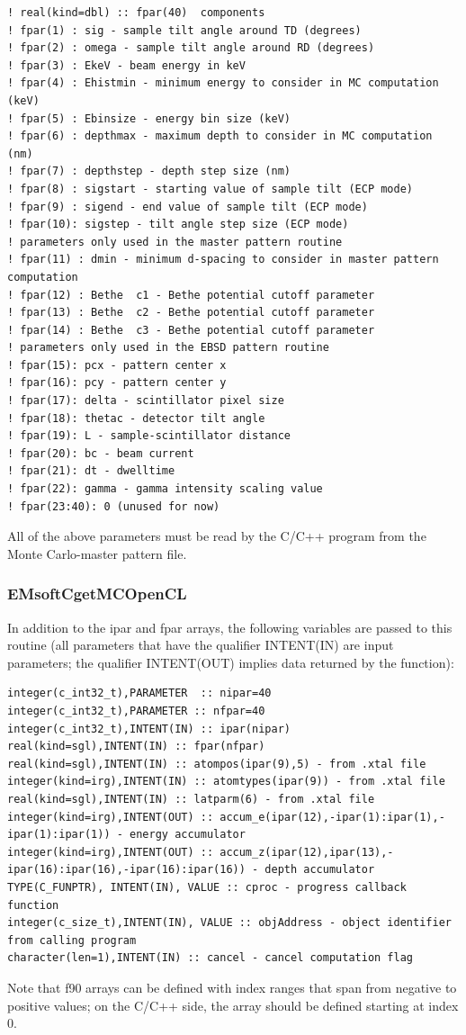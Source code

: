 \documentclass[DIV=calc, paper=letter, fontsize=11pt]{scrartcl}	 %
\begin{document}
{\begin{verbatim}
! real(kind=dbl) :: fpar(40)  components
! fpar(1) : sig - sample tilt angle around TD (degrees)
! fpar(2) : omega - sample tilt angle around RD (degrees)
! fpar(3) : EkeV - beam energy in keV
! fpar(4) : Ehistmin - minimum energy to consider in MC computation (keV)
! fpar(5) : Ebinsize - energy bin size (keV)
! fpar(6) : depthmax - maximum depth to consider in MC computation (nm)
! fpar(7) : depthstep - depth step size (nm)
! fpar(8) : sigstart - starting value of sample tilt (ECP mode)
! fpar(9) : sigend - end value of sample tilt (ECP mode)
! fpar(10): sigstep - tilt angle step size (ECP mode)
! parameters only used in the master pattern routine
! fpar(11) : dmin - minimum d-spacing to consider in master pattern computation
! fpar(12) : Bethe  c1 - Bethe potential cutoff parameter
! fpar(13) : Bethe  c2 - Bethe potential cutoff parameter
! fpar(14) : Bethe  c3 - Bethe potential cutoff parameter
! parameters only used in the EBSD pattern routine
! fpar(15): pcx - pattern center x
! fpar(16): pcy - pattern center y
! fpar(17): delta - scintillator pixel size
! fpar(18): thetac - detector tilt angle
! fpar(19): L - sample-scintillator distance
! fpar(20): bc - beam current
! fpar(21): dt - dwelltime
! fpar(22): gamma - gamma intensity scaling value
! fpar(23:40): 0 (unused for now)
\end{verbatim}}
All of the above parameters must be read by the C/C++ program from the Monte Carlo-master pattern file.

\subsubsection{EMsoftCgetMCOpenCL}
In addition to the \textsf{ipar} and \textsf{fpar} arrays, the following variables are 
passed to this routine (all parameters that have the qualifier \textsf{INTENT(IN)} are input parameters;
the qualifier \textsf{INTENT(OUT)} implies data returned by the function):

{\footnotesize\begin{verbatim}
integer(c_int32_t),PARAMETER  :: nipar=40
integer(c_int32_t),PARAMETER :: nfpar=40
integer(c_int32_t),INTENT(IN) :: ipar(nipar)
real(kind=sgl),INTENT(IN) :: fpar(nfpar)
real(kind=sgl),INTENT(IN) :: atompos(ipar(9),5) - from .xtal file
integer(kind=irg),INTENT(IN) :: atomtypes(ipar(9)) - from .xtal file
real(kind=sgl),INTENT(IN) :: latparm(6) - from .xtal file
integer(kind=irg),INTENT(OUT) :: accum_e(ipar(12),-ipar(1):ipar(1),-ipar(1):ipar(1)) - energy accumulator
integer(kind=irg),INTENT(OUT) :: accum_z(ipar(12),ipar(13),-ipar(16):ipar(16),-ipar(16):ipar(16)) - depth accumulator
TYPE(C_FUNPTR), INTENT(IN), VALUE :: cproc - progress callback function
integer(c_size_t),INTENT(IN), VALUE :: objAddress - object identifier from calling program
character(len=1),INTENT(IN) :: cancel - cancel computation flag
\end{verbatim}}
Note that f90 arrays can be defined with index ranges that span from negative to positive values; on the 
C/C++ side, the array should be defined starting at index $0$.
\end{document}
